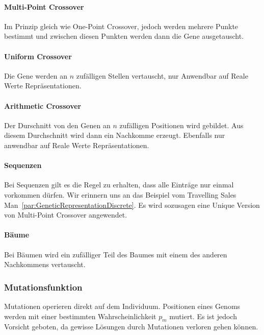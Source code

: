         \paragraph{Multi-Point Crossover}

          Im Prinzip gleich wie One-Point Crossover, jedoch werden mehrere Punkte bestimmt und
          zwischen diesen Punkten werden dann die Gene ausgetauscht.

        \paragraph{Uniform Crossover}

          Die Gene werden an \(n\) zufälligen Stellen vertauscht, nur Anwendbar auf Reale Werte Repräsentationen.

        \paragraph{Arithmetic Crossover}

          Der Durschnitt von den Genen an \(n\) zufälligen Positionen wird gebildet.
          Aus diesem Durchschnitt wird dann ein Nachkomme erzeugt.
          Ebenfalls nur anwendbar auf Reale Werte Repräsentationen.

        \paragraph{Sequenzen}

          Bei Sequenzen gilt es die Regel zu erhalten, dass alle Einträge nur einmal vorkommen dürfen.
          Wir erinnern uns an das Beispiel vom Travelling Sales Man~\ref{par:GeneticRepresentationDiscrete}.
          Es wird sozusagen eine Unique Version von  Multi-Point Crossover angewendet.

        \paragraph{Bäume}

          Bei Bäumen wird ein zufälliger Teil des Baumes mit einem des anderen Nachkommens vertauscht.

    \subsubsection{Mutationsfunktion}

      Mutationen operieren direkt auf dem Individuum.
      Positionen eines Genoms werden mit einer bestimmten Wahrscheinlichkeit \(p_{m}\) mutiert.
      Es ist jedoch Vorsicht geboten, da gewisse Lösungen durch Mutationen verloren gehen können.

